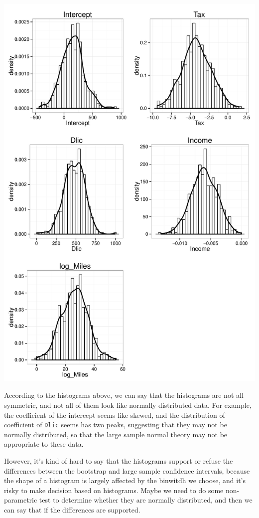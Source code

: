 \documentclass[12pt,oneside,a4paper]{article}\usepackage[]{graphicx}\usepackage[]{xcolor}
\newenvironment{knitrout}{}{} %
\newcommand{\m}[1]{\texttt{{#1}}}
\begin{document}
\begin{knitrout}
{\centering \includegraphics[width=.9\linewidth]{figure/p7102} 

}



\end{knitrout}

According to the histograms above, we can say that the histograms are not all symmetric, and not all of them look like normally distributed data. For example, the coefficient of the intercept seems like skewed, and the distribution of coefficient of \m{Dlic} seems has two peaks, suggesting that they may not be normally distributed, so that the large sample normal theory may not be appropriate to these data. 

However, it's kind of hard to say that the histograms support or refuse the differences between the bootstrap and large sample confidence intervals, because the shape of a histogram is largely affected by the binwitdh we choose, and it's risky to make decision based on histograms. Maybe we need to do some non-parametric test to determine whether they are normally distributed, and then we can say that if the differences are supported.
\end{document}
